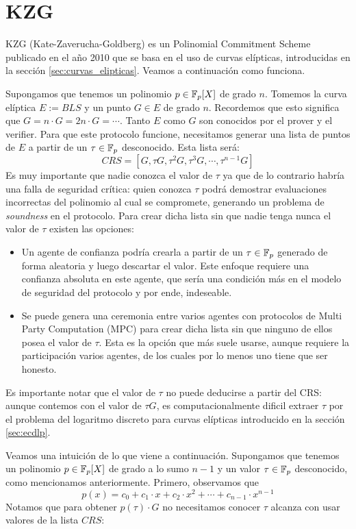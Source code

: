 \section{KZG}\label{sec:kzg}
KZG (Kate-Zaverucha-Goldberg) es un Polinomial Commitment Scheme publicado en el año 2010 que se basa en el uso de curvas elípticas, introducidas en la sección \ref{sec:curvas_elipticas}. Veamos a continuación como funciona. 

Supongamos que tenemos un polinomio $p \in \mathbb{F}_p[X]$ de grado $n$. Tomemos la curva elíptica $E := BLS$ y un punto $G \in E$ de grado $n$. Recordemos que esto significa que $G = n\cdot G = 2n\cdot G = \cdots$. Tanto $E$ como $G$ son conocidos por el prover y el verifier. Para que este protocolo funcione, necesitamos generar una lista de puntos de $E$ a partir de un $\tau \in \mathbb{F}_p$ desconocido. Esta lista será:
$$CRS = [G, \tau G, \tau^2 G, \tau^3 G, \cdots, \tau^{n-1}G ]$$
Es muy importante que nadie conozca el valor de $\tau$ ya que de lo contrario habría una falla de seguridad crítica: quien conozca $\tau$ podrá demostrar evaluaciones incorrectas del polinomio al cual se compromete, generando un problema de \textit{soundness} en el protocolo. Para crear dicha lista sin que nadie tenga nunca el valor de $\tau$ existen las opciones:
\begin{itemize}
    \item Un agente de confianza podría crearla a partir de un $\tau \in \mathbb{F}_p$ generado de forma aleatoria y luego descartar el valor. Este enfoque requiere una confianza absoluta en este agente, que sería una condición más en el modelo de seguridad del protocolo y por ende, indeseable. 
    \item Se puede genera una ceremonia entre varios agentes con protocolos de Multi Party Computation (MPC) para crear dicha lista sin que ninguno de ellos posea el valor de $\tau$. Esta es la opción que más suele usarse, aunque requiere la participación varios agentes, de los cuales por lo menos uno tiene que ser honesto. 
\end{itemize}

Es importante notar que el valor de $\tau$ no puede deducirse a partir del CRS: aunque contemos con el valor de $\tau G$, es computacionalmente dificil extraer $\tau$ por el problema del logaritmo discreto para curvas elípticas introducido en la sección \ref{sec:ecdlp}.

Veamos una intuición de lo que viene a continuación. Supongamos que tenemos un polinomio $p \in \mathbb{F}_p[X]$ de grado a lo sumo $n-1$ y un valor $\tau \in \mathbb{F}_p$ desconocido, como mencionamos anteriormente. Primero, observamos que 
$$p(x) = c_0 + c_1\cdot x + c_2 \cdot x^2 + \cdots + c_{n-1} \cdot x^{n-1}$$
Notamos que para obtener $p(\tau)\cdot G$ no necesitamos conocer $\tau$ alcanza con usar valores de la lista $CRS$:

